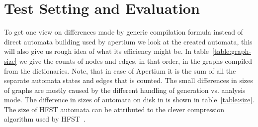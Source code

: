 \documentclass[a4paper]{article}
\begin{document}
\section{Test Setting and Evaluation}
\label{sec:evaluation}

%

To get one view on differences made by generic compilation formula instead of
direct automata building used by apertium we look at the created automata, this
will also give us rough idea of what its efficiency might be. In
table~\ref{table:graph-size} we give the counts of nodes and edges, in that
order, in the graphs compiled from the dictionaries. Note, that in case
of Apertium it is the sum of all the separate automata states and edges that
is counted. The small differences in sizes of graphs are mostly caused by
the different handling of generation vs. analysis mode. The difference in sizes
of automata on disk in is shown in table~\ref{table:size}.
The size of HFST automata can be attributed to the clever compression
algorithm used by HFST~\cite{silfverberg/2009/fsmnlp}.
\end{document}
